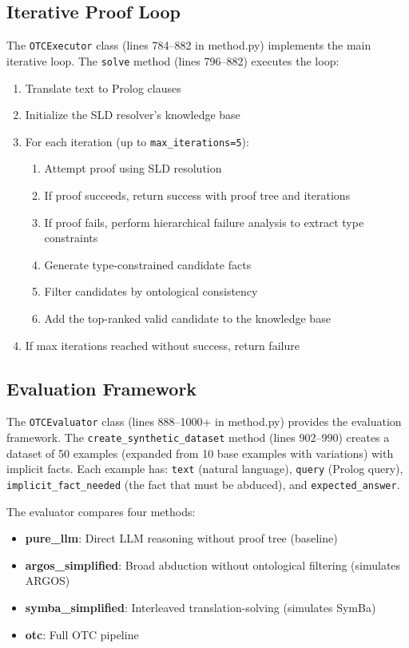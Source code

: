 \documentclass[11pt,letterpaper]{article}
\begin{document}
\subsection{Iterative Proof Loop}

The \texttt{OTCExecutor} class (lines 784--882 in method.py) implements the main iterative loop. The \texttt{solve} method (lines 796--882) executes the loop:

\begin{enumerate}
  \item Translate text to Prolog clauses
  \item Initialize the SLD resolver's knowledge base
  \item For each iteration (up to \texttt{max\_iterations=5}):
     \begin{enumerate}
       \item[a.] Attempt proof using SLD resolution
       \item[b.] If proof succeeds, return success with proof tree and iterations
       \item[c.] If proof fails, perform hierarchical failure analysis to extract type constraints
       \item[d.] Generate type-constrained candidate facts
       \item[e.] Filter candidates by ontological consistency
       \item[f.] Add the top-ranked valid candidate to the knowledge base
     \end{enumerate}
  \item If max iterations reached without success, return failure
\end{enumerate}

\subsection{Evaluation Framework}

The \texttt{OTCEvaluator} class (lines 888--1000+ in method.py) provides the evaluation framework. The \texttt{create\_synthetic\_dataset} method (lines 902--990) creates a dataset of 50 examples (expanded from 10 base examples with variations) with implicit facts. Each example has: \texttt{text} (natural language), \texttt{query} (Prolog query), \texttt{implicit\_fact\_needed} (the fact that must be abduced), and \texttt{expected\_answer}.

The evaluator compares four methods:
\begin{itemize}
  \item \textbf{pure\_llm}: Direct LLM reasoning without proof tree (baseline)
  \item \textbf{argos\_simplified}: Broad abduction without ontological filtering (simulates ARGOS)
  \item \textbf{symba\_simplified}: Interleaved translation-solving (simulates SymBa)
  \item \textbf{otc}: Full OTC pipeline
\end{itemize}
\end{document}
